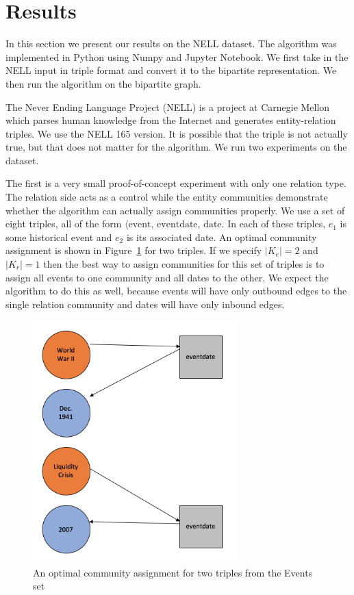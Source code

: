 \documentclass[12pt]{article}
\begin{document}
\section{Results}
\label{Results}

In this section we present our results on the NELL dataset\cite{Carlson2010}.
The algorithm was implemented in Python using Numpy\cite{Jones2001} and Jupyter
Notebook\cite{Perez2007}. We first take in the NELL input in triple format and
convert it to the bipartite representation. We then run the algorithm on the
bipartite graph.

The Never Ending Language Project (NELL) is a project at Carnegie Mellon which
parses human knowledge from the Internet and generates entity-relation triples.
We use the NELL 165 version. It is possible that the triple is not actually
true, but that does not matter for the algorithm. We run two experiments on the
dataset.

The first is a very small proof-of-concept experiment with only one relation
type. The relation side acts as a control while the entity communities
demonstrate whether the algorithm can actually assign communities properly. We
use a set of eight triples, all of the form $\langle \text{event},
\,\text{eventdate}, \,\text{date}$. In each of these triples, $e_1$ is some
historical event and $e_2$ is its associated date. An optimal community
assignment is shown in Figure~\ref{fig: events} for two triples. If we specify
$|K_e| = 2$ and $|K_r|=1$ then the best way to assign communities for this set of
triples is to assign all events to one community and all dates to the other. We
expect the algorithm to do this as well, because events will have only outbound
edges to the single relation community and dates will have only inbound edges.

\begin{figure}[t!]
    \centering
    \includegraphics[width=0.7\textwidth,keepaspectratio]{figures/event_example.png}
    \caption{An optimal community assignment for two triples from the Events set}
    \label{fig: events}
\end{figure}
\end{document}
